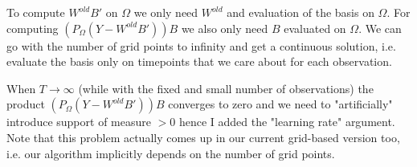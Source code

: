 \documentclass{article}
\newcommand{\bb}{\mathbf{b}}
\newcommand{\ba}{\mathbf{a}}
\DeclareMathOperator*{\argmin}{arg\,min}
\begin{document}
To compute $W^{old}B'$ on $\Omega$ we only need $W^{old}$ and evaluation of the basis on $\Omega$. For computing $(P_\Omega(Y - W^{old}B'))B$ we also only need $B$ evaluated on $\Omega$. We can go with the number of grid points to infinity and get a continuous solution, i.e. evaluate the basis only on timepoints that we care about for each observation.

When $T \rightarrow \infty$ (while with the fixed and small number of observations) the product $(P_\Omega(Y - W^{old}B'))B$ converges to zero and we need to "artificially" introduce support of measure $>0$ hence I added the "learning rate" argument. Note that this problem actually comes up in our current grid-based version too, i.e. our algorithm implicitly depends on the number of grid points.



\end{document}
